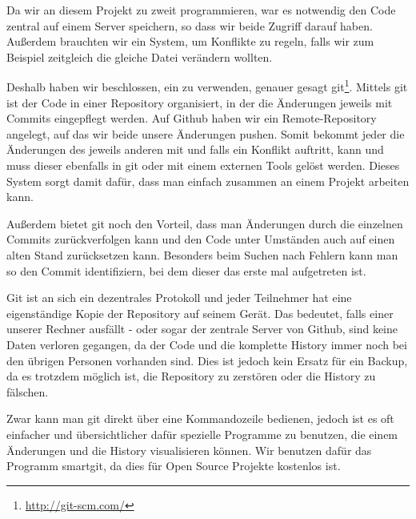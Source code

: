 Da wir an diesem Projekt zu zweit programmieren, war es notwendig den Code zentral auf einem Server speichern, so dass wir beide Zugriff darauf haben.
Außerdem brauchten wir ein System, um Konflikte zu regeln, falls wir zum Beispiel zeitgleich die gleiche Datei verändern wollten.

Deshalb haben wir beschlossen, ein  zu verwenden, genauer gesagt git\footnote{\url{http://git-scm.com/}}. Mittels git ist der Code in einer Repository organisiert, in der die Änderungen jeweils mit Commits eingepflegt werden. Auf Github haben wir ein Remote-Repository angelegt, auf das wir beide unsere Änderungen pushen. Somit bekommt jeder die Änderungen des jeweils anderen mit und falls ein Konflikt auftritt, kann und muss dieser ebenfalls in git oder mit einem externen Tools gelöst werden. Dieses System sorgt damit dafür, dass man einfach zusammen an einem Projekt arbeiten kann.


Außerdem bietet git noch den Vorteil, dass man Änderungen durch die einzelnen Commits zurückverfolgen kann und den Code unter Umständen auch auf einen alten Stand zurücksetzen kann. Besonders beim Suchen nach Fehlern kann man so den Commit identifiziern, bei dem dieser das erste mal aufgetreten ist. 

Git ist an sich ein dezentrales Protokoll und jeder Teilnehmer hat eine eigenständige Kopie der Repository auf seinem Gerät. Das bedeutet, falls einer unserer Rechner ausfällt - oder sogar der zentrale Server von Github, sind keine Daten verloren gegangen, da der Code und die komplette History immer noch bei den übrigen Personen vorhanden sind. Dies ist jedoch kein Ersatz für ein Backup, da es trotzdem möglich ist, die Repository zu zerstören oder die History zu fälschen.\cite[S 5f]{PGIT}

Zwar kann man git direkt über eine Kommandozeile bedienen, jedoch ist es oft einfacher und übersichtlicher dafür spezielle Programme zu benutzen, die einem Änderungen und die History visualisieren können. Wir benutzen dafür das Programm smartgit, da dies für Open Source Projekte kostenlos ist.

